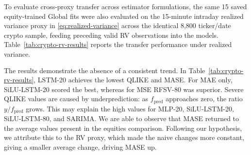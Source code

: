 \documentclass[12pt,a4paper]{article}
\numberwithin{equation}{section}
\numberwithin{table}{section}
\numberwithin{figure}{section}
\begin{document}
To evaluate cross-proxy transfer across estimator formulations, the same 15 saved equity-trained Global fits were also evaluated on the 15-minute intraday realized variance proxy in \eqref{eq:realized-variance} across the identical 8,800 ticker/date crypto sample, feeding preceding valid RV observations into the models. Table~\ref{tab:crypto-rv-results} reports the transfer performance under realized variance.

The results demonstrate the absence of a consistent trend. In Table~\ref{tab:crypto-rv-results}, LSTM-20 achieves the lowest QLIKE and MASE. For MAE only, SiLU-LSTM-20 scored the best, whereas for MSE RFSV-80 was superior. Severe QLIKE values are caused by underprediction: as $f_{\mathrm{pred}}$ approaches zero, the ratio $y/f_{\mathrm{pred}}$ grows. This may explain the high values for MLP-20, SiLU-LSTM-20, SiLU-LSTM-80, and SARIMA. We are able to observe that MASE returned to the average values present in the equities comparison. Following our hypothesis, we attribute this to the RV proxy, which made the naive changes more constant, giving a smaller average change, driving MASE up.   
\end{document}
